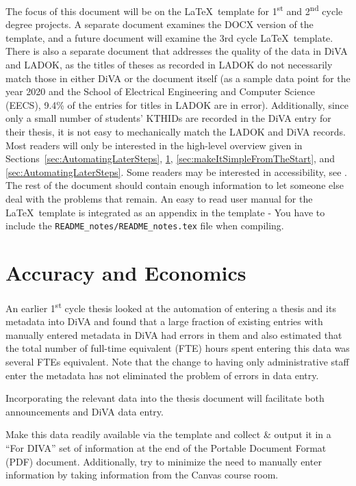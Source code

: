 The focus of this document will be on the \LaTeX\ template for 1\textsuperscript{st} and 2\textsuperscript{nd} cycle degree projects. A separate document examines the DOCX version of the template, and a future document will examine the 3rd cycle \LaTeX~template. There is also a separate document that addresses the quality of the data in DiVA and LADOK, as the titles of theses as recorded in LADOK do not necessarily match those in either DiVA or the document itself (as a sample data point for the year 2020 and the School of Electrical Engineering and Computer Science (EECS), 9.4\% of the entries for titles in LADOK are in error). Additionally, since only a small number of students’ KTHIDs are recorded in the DiVA entry for their thesis, it is not easy to mechanically match the LADOK and DiVA records.
Most readers will only be interested in the high-level overview given in Sections~\ref{sec:AutomatingLaterSteps}, \ref{sec:accuracyAndEconomics}, \ref{sec:makeItSimpleFromTheStart}, and \ref{sec:AutomatingLaterSteps}. Some readers may be interested in accessibility, see . The rest of the document should contain enough information to let someone else deal with the problems that remain. An easy to read user manual for the \LaTeX~template is integrated as an appendix in the template
{- You have to include the \texttt{README\_notes/README\_notes.tex} file when compiling.}




\section{Accuracy and Economics}
\label{sec:accuracyAndEconomics}

An earlier 1\textsuperscript{st} cycle thesis  looked at the automation of entering a thesis and its metadata into DiVA and found that a large fraction of existing entries with manually entered metadata in DiVA had errors in them and also estimated that the total number of full-time equivalent (FTE) hours spent entering this data was several FTEs equivalent. Note that the change to having only administrative staff enter the metadata has not eliminated the problem of errors in data entry.
\begin{description}[labelwidth =\widthof{\textbf{Hypothesis}}, leftmargin = !]
\item[Hypothesis] Incorporating the relevant data into the thesis document will facilitate both announcements and DiVA data entry.

\item[Approach] Make this data readily available via the template and collect \& output it in a 
“For DIVA” set of information at the end of the Portable Document Format (PDF) document. Additionally, try to minimize the need to manually enter information by taking information from the Canvas course room.
\end{description}

